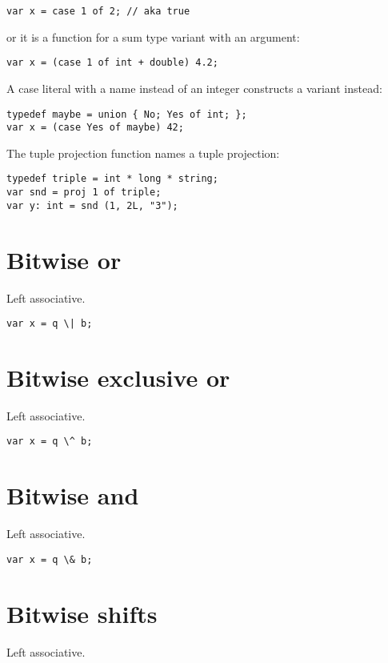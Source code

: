\documentclass[oneside]{book}
\begin{document}
\begin{verbatim}
var x = case 1 of 2; // aka true
\end{verbatim}

or it is a function for a sum type variant with an argument:

\begin{verbatim}
var x = (case 1 of int + double) 4.2;
\end{verbatim}


A case literal with a name instead of an integer constructs
a variant instead:

\begin{verbatim}
typedef maybe = union { No; Yes of int; };
var x = (case Yes of maybe) 42;
\end{verbatim}


The tuple projection function names a tuple projection:

\begin{verbatim}
typedef triple = int * long * string;
var snd = proj 1 of triple;
var y: int = snd (1, 2L, "3");
\end{verbatim}


\section{Bitwise or}
Left associative.

\begin{verbatim}
var x = q \| b;
\end{verbatim}


\section{Bitwise exclusive or}
Left associative.

\begin{verbatim}
var x = q \^ b;
\end{verbatim}


\section{Bitwise and}
Left associative.

\begin{verbatim}
var x = q \& b;
\end{verbatim}


\section{Bitwise shifts}
Left associative.
\end{document}
